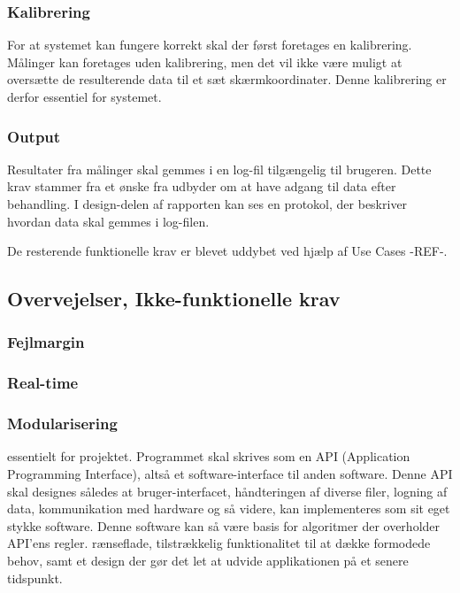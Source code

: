 \documentclass[rapport.tex]{subfiles}
\begin{document}
	\subsubsection{Kalibrering}
	For at systemet kan fungere korrekt skal der først foretages en kalibrering. Målinger kan foretages uden kalibrering, men det vil ikke være muligt at oversætte de resulterende data til et sæt skærmkoordinater. Denne kalibrering er derfor essentiel for systemet.
	
	\subsubsection{Output}
	Resultater fra målinger skal gemmes i en log-fil tilgængelig til brugeren. Dette krav stammer fra et ønske fra udbyder om at have adgang til data efter behandling. I
	design-delen af rapporten kan ses en protokol, der beskriver hvordan data skal gemmes i log-filen. 
	
	
	
	De resterende funktionelle krav er blevet uddybet ved hjælp af Use Cases -REF-.
	
	
	\subsection{Overvejelser, Ikke-funktionelle krav}
	
	\subsubsection{Fejlmargin}
	
	
	
	\subsubsection{Real-time}
	
	
	
	\subsubsection{Modularisering}
	essentielt for projektet. Programmet skal skrives som en API (Application Programming Interface), altså et software-interface til anden software. Denne API skal designes således at bruger-interfacet, håndteringen af diverse filer, logning af data, kommunikation med hardware og så videre, kan implementeres som sit eget stykke software. Denne software kan så være basis for algoritmer der overholder API'ens regler. 
	rænseflade, tilstrækkelig
	funktionalitet til at dække formodede behov, samt et design der gør det let at udvide
	applikationen på et senere tidspunkt.
	
\end{document}
